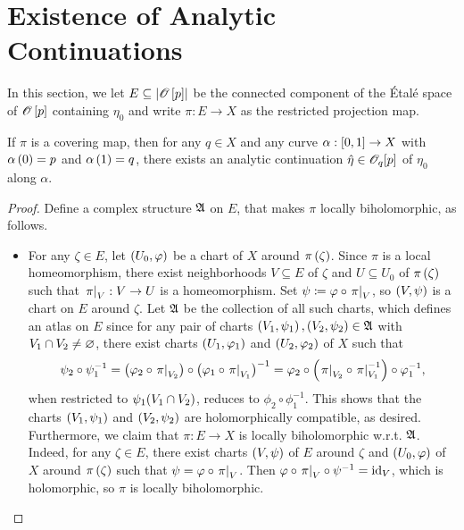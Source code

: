 \documentclass[../Moduli_Spaces_of_Riemann_Surfaces.tex]{subfiles}
\begin{document}
    \section{Existence of Analytic Continuations}
    In this section, we let $E\subseteq\l|\HOLO\l[p\r]\r|$ be the connected component of the Étalé space of $\HOLO\l[p\r]$ containing $\eta_0$ and write $\pi:E\to X$ as the restricted projection map.
    \begin{theorem}\label{CS:thm:existence_of_analytic_continuation}
        If $\pi$ is a covering map, then for any $q\in X$ and any curve $\alpha:\l[0,1\r]\to X$ with $\alpha\l(0\r)=p$ and $\alpha\l(1\r)=q$, there exists an analytic continuation $\hat{\eta}\in\HOLO_q\!\l[p\r]$ of $\eta_0$ along $\alpha$.
    \end{theorem}
    \begin{proof}
        Define a complex structure $\mf{A}$ on $E$, that makes $\pi$ locally biholomorphic, as follows.
        \begin{itemize}
            \item For any $\zeta\in E$, let $\tpl{U_0,\phi}$ be a chart of $X$ around $\pi\l(\zeta\r)$. Since $\pi$ is a local homeomorphism, there exist neighborhoods $V\subseteq E$ of $\zeta$ and $U\subseteq U_0$ of $\pi\l(\zeta\r)$ such that $\l.\pi\r|_V:V\to U$ is a homeomorphism. Set $\psi\coloneqq\phi\circ\l.\pi\r|_V$, so $\tpl{V,\psi}$ is a chart on $E$ around $\zeta$. Let $\mf{A}$ be the collection of all such charts, which defines an atlas on $E$ since for any pair of charts $\tpl{V_1,\psi_1},\tpl{V_2,\psi_2}\in\mf{A}$ with $V_1\cap V_2\neq\em$, there exist charts $\tpl{U_1,\phi_1}$ and $\tpl{U_2,\phi_2}$ of $X$ such that
                \begin{equation*}
                    \psi_2\circ\psi_1^{-1}=\l(\phi_2\circ\l.\pi\r|_{V_2}\r)\circ\l(\phi_1\circ\l.\pi\r|_{V_1}\r)^{-1}=\phi_2\circ\l(\l.\pi\r|_{V_2}\circ\l.\pi\r|_{V_1}^{-1}\r)\circ\phi_1^{-1},
                \end{equation*}
                when restricted to $\psi_1\!\l(V_1\cap V_2\r)$, reduces to $\phi_2\circ\phi_1^{-1}$. This shows that the charts $\tpl{V_1,\psi_1}$ and $\tpl{V_2,\psi_2}$ are holomorphically compatible, as desired. Furthermore, we claim that $\pi:E\to X$ is locally biholomorphic w.r.t. $\mf{A}$. Indeed, for any $\zeta\in E$, there exist charts $\tpl{V,\psi}$ of $E$ around $\zeta$ and $\tpl{U_0,\phi}$ of $X$ around $\pi\l(\zeta\r)$ such that $\psi=\phi\circ\l.\pi\r|_V$. Then $\phi\circ\l.\pi\r|_V\circ\psi^{-1}=\id_V$, which is holomorphic, so $\pi$ is locally biholomorphic.

\end{itemize}
\end{proof}
\end{document}
